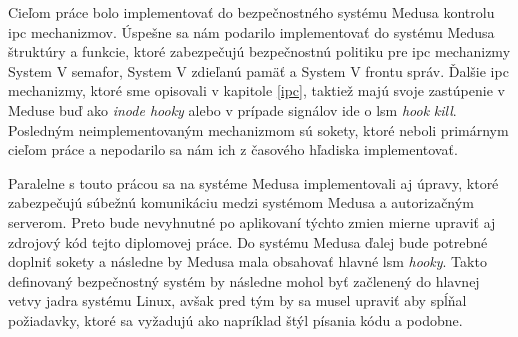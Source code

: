 Cieľom práce bolo implementovať do bezpečnostného systému Medusa kontrolu \acrshort{ipc} mechanizmov. Úspešne sa nám podarilo implementovať do systému Medusa štruktúry a funk\-cie, ktoré zabezpečujú bezpečnostnú politiku pre \acrshort{ipc} mechanizmy System V semafor, System V zdieľanú pamäť a System V frontu správ. Ďalšie \acrshort{ipc} mechanizmy, ktoré sme opisovali v kapitole \ref{ipc}, taktiež majú svoje zastúpenie v Meduse buď ako \textit{inode hooky} alebo v prípade signálov ide o \acrshort{lsm} \textit{hook} \textit{kill}. Posledným neimplementovaným mechanizmom sú sokety, ktoré neboli primárnym cieľom práce a nepodarilo sa nám ich z časového hľadiska implementovať. 

Paralelne s touto prácou sa na systéme Medusa implementovali aj úpravy, ktoré zabezpečujú súbežnú komunikáciu medzi systémom Medusa a autorizačným serverom. Preto bude nevyhnutné po aplikovaní týchto zmien mierne upraviť aj zdrojový kód tejto diplomovej práce. Do systému Medusa ďalej bude potrebné doplniť sokety a následne by Medusa mala obsahovať hlavné \acrshort{lsm} \textit{hooky}. Takto definovaný bezpečnostný systém by následne mohol byť začlenený do hlavnej vetvy jadra systému Linux, avšak pred tým by sa musel upraviť aby spĺňal požiadavky, ktoré sa vyžadujú ako napríklad štýl písania kódu a podobne.
